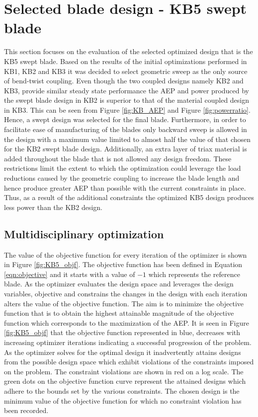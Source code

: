 \section{Selected blade design - KB5 swept blade}
\label{sec:final_design}
This section focuses on the evaluation of the selected optimized design that is the KB5 swept blade. Based on the results of the initial optimizations performed in KB1, KB2 and KB3 it was decided to select geometric sweep as the only source of bend-twist coupling. Even though the two coupled designs namely KB2 and KB3, provide similar steady state performance the AEP and power produced by the swept blade design in KB2 is superior to that of the material coupled design in KB3. This can be seen from Figure \ref{fig:KB_AEP} and Figure \ref{fig:powerratio}. Hence, a swept design was selected for the final blade. Furthermore, in order to facilitate ease of manufacturing of the blades only backward sweep is allowed in the design with a maximum value limited to almost half the value of that chosen for the KB2 swept blade design. Additionally, an extra layer of triax material is added throughout the blade that is not allowed any design freedom. These restrictions limit the extent to which the optimization could leverage the load reductions caused by the geometric coupling to increase the blade length and hence produce greater AEP than possible with the current constraints in place. Thus, as a result of the additional constraints the optimized KB5 design produces less power than the KB2 design.

\subsection{Multidisciplinary optimization}
\label{subsec:MDO}
The value of the objective function for every iteration of the optimizer is shown in Figure \ref{fig:KB5_objf}. The objective function has been defined in Equation \ref{eqn:objective} and it starts with a value of $-1$ which represents the reference blade. As the optimizer evaluates the design space and leverages the design variables, objective and constrains the changes in the design with each iteration alters the value of the objective function. The aim is to minimize the objective function that is to obtain the highest attainable magnitude of the objective function which corresponds to the maximization of the AEP. It is seen in Figure \ref{fig:KB5_objf} that the objective function represented in blue, decreases with increasing optimizer iterations indicating a successful progression of the problem. As the optimizer solves for the optimal design it inadvertently attains designs from the possible design space which exhibit violations of the constraints imposed on the problem. The constraint violations are shown in red on a log scale. The green dots on the objective function curve represent the attained designs which adhere to the bounds set by the various constraints. The chosen design is the minimum value of the objective function for which no constraint violation has been recorded.

